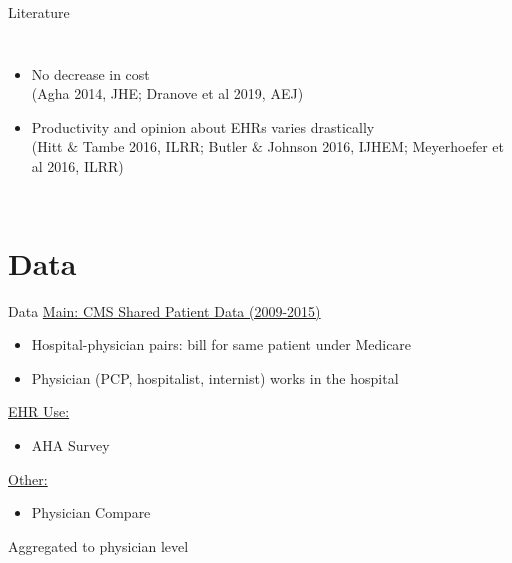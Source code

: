\documentclass[10pt]{beamer}
\begin{document}
\begin{frame}{Literature}
\begin{columns}
\begin{itemize}
            \footnotesize 
            
            \item No decrease in cost \\ \vspace{1mm}
            \tiny (Agha 2014, JHE; Dranove et al 2019, AEJ) 
            
            \footnotesize
            
            \item Productivity and opinion about EHRs varies drastically \\ \vspace{1mm}
            \tiny (Hitt $\&$ Tambe 2016, ILRR; Butler $\&$ Johnson 2016, IJHEM; Meyerhoefer et al 2016, ILRR)
            
        \end{itemize}
        
\end{columns}

\end{frame}



\section{Data}

\begin{frame}{Data}
    \underline{Main: CMS Shared Patient Data (2009-2015)}
    \begin{itemize}
        \item Hospital-physician pairs: bill for same patient under Medicare
        \item Physician (PCP, hospitalist, internist) works in the hospital
    \end{itemize}
    
    \vspace{3mm}
    
    \underline{EHR Use:}
    \begin{itemize}
        \item AHA Survey
    \end{itemize}
    
    \vspace{3mm}
    
    \underline{Other:}
    \begin{itemize}
        \item Physician Compare
    \end{itemize}
    
    \vspace{3mm}
    
    Aggregated to physician level
\end{frame}
\end{document}
